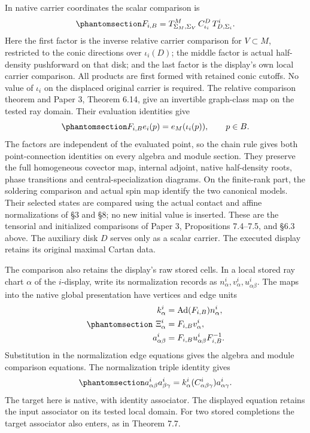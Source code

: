 \documentclass[
  english,
  11pt,
  reqno]{amsart}
\begin{document}
In native carrier coordinates the scalar comparison is
\begin{equation}\protect\phantomsection\label{eq:ordinary-atlas-local-completion-lift}{
F_{i,B}
=T^M_{\Sigma_M,\Sigma_V}\,
  C_{\iota_i}^{D}\,
  T^i_{D,\Sigma_i}.
}\end{equation} Here the first factor is the inverse relative carrier
comparison for \(V\subset M\), restricted to the conic directions over
\(\iota_i(D)\); the middle factor is actual half-density pushforward on
that disk; and the last factor is the display's own local carrier
comparison. All products are first formed with retained conic cutoffs.
No value of \(\iota_i\) on the displaced original carrier is required.
The relative comparison theorem and Paper 3, Theorem 6.14, give an
invertible graph-class map on the tested ray domain. Their evaluation
identities give
\begin{equation}\protect\phantomsection\label{eq:ordinary-atlas-local-evaluation}{
F_{i,B}e_i(p)=e_M(\iota_i(p)),\qquad p\in B.
}\end{equation} The factors are independent of the evaluated point, so
the chain rule gives both point-connection identities on every algebra
and module section. They preserve the full homogeneous covector map,
internal adjoint, native half-density roots, phase transitions and
central-specialization diagrams. On the finite-rank part, the soldering
comparison and actual spin map identify the two canonical models. Their
selected states are compared using the actual contact and affine
normalizations of §3 and §8; no new initial value is inserted. These are
the tensorial and initialized comparisons of Paper 3, Propositions
7.4--7.5, and §6.3 above. The auxiliary disk \(D\) serves only as a
scalar carrier. The executed display retains its original maximal Cartan
data.

The comparison also retains the display's raw stored cells. In a local
stored ray chart \(\alpha\) of the \(i\)-display, write its
normalization records as \(n^i_\alpha,v^i_\alpha,u^i_{\alpha\beta}\).
The maps into the native global presentation have vertices and edge
units
\begin{equation}\protect\phantomsection\label{eq:ordinary-atlas-local-stored-completion}{
\begin{aligned}
k^i_\alpha&=\operatorname{Ad}(F_{i,B})n^i_\alpha,\\
\Xi^i_\alpha&=F_{i,B}v^i_\alpha,\\
a^i_{\alpha\beta}&=F_{i,B}u^i_{\alpha\beta}F_{i,B}^{-1}.
\end{aligned}
}\end{equation} Substitution in the normalization edge equations gives
the algebra and module comparison equations. The normalization triple
identity gives
\begin{equation}\protect\phantomsection\label{eq:ordinary-atlas-local-stored-triple}{
a^i_{\alpha\beta}a^i_{\beta\gamma}
=k^i_\alpha(C^i_{\alpha\beta\gamma})
  a^i_{\alpha\gamma}.
}\end{equation} The target here is native, with identity associator. The
displayed equation retains the input associator on its tested local
domain. For two stored completions the target associator also enters, as
in Theorem 7.7.
\end{document}
